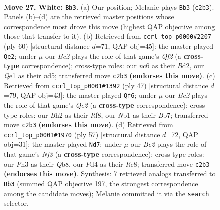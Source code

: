 \documentclass[11pt]{article}
\begin{document}
\clearpage

\begin{figure}[p]\centering
\begin{subfigure}{0.46\textwidth}\centering
\resizebox{\linewidth}{!}{%
\newchessgame
\chessboard[
  setfen={r5k1/1p3pb1/pnn2qp1/3p4/3P3p/7P/PPB2PPB/RN2Q1K1 w - - 0 27},
  showmover=false,
  pgfstyle=straightmove, color=movearrow, markmove={c2-b3}
]}
\caption{}
\end{subfigure}\hfill
\begin{subfigure}{0.46\textwidth}\centering
\resizebox{\linewidth}{!}{%
\newchessgame
\chessboard[
  setfen={3r2k1/1bq2p1p/1p2p1p1/pB1nP1P1/8/P4P2/1P1B1QP1/3R2K1 w - - 9 31},
  showmover=false,
  pgfstyle=straightmove, color=movearrow, markmove={f2-e2}
]}
\caption{}
\end{subfigure}
\\[4pt]
\begin{subfigure}{0.46\textwidth}\centering
\resizebox{\linewidth}{!}{%
\newchessgame
\chessboard[
  setfen={5rk1/1b2qpp1/1p1b3p/p2p4/3N4/1PQ1P2B/P4PPP/2R3K1 b - - 1 24},
  showmover=false,
  pgfstyle=straightmove, color=movearrow, markmove={e7-f6}
]}
\caption{}
\end{subfigure}\hfill
\begin{subfigure}{0.46\textwidth}\centering
\resizebox{\linewidth}{!}{%
\newchessgame
\chessboard[
  setfen={1qr3k1/5pp1/p3pn1p/1b6/pP2P3/P3QN1P/5PP1/1BR3K1 b - - 5 29},
  showmover=false,
  pgfstyle=straightmove, color=movearrow, markmove={f6-d7}
]}
\caption{}
\end{subfigure}
\caption{\textbf{Move 27, White: \texttt{Bb3}.} (a) Our position; Melanie plays \texttt{Bb3} (\texttt{c2b3}). Panels (b)--(d) are the retrieved master positions whose correspondence most drove this move (highest QAP objective among those that transfer to it). (b) Retrieved from \texttt{ccrl\_top\_p0000\#2207} (ply 60) [structural distance $d$=71, QAP obj=45]: the master played \texttt{Qe2}; under $\mu$ our \emph{Bc2} plays the role of that game's \emph{Qf2} (a \textbf{cross-type} correspondence); cross-type roles: our \emph{n}c6 as their \emph{B}d2, our \emph{Q}e1 as their \emph{n}d5; transferred move \texttt{c2b3} \textbf{(endorses this move)}. (c) Retrieved from \texttt{ccrl\_top\_p0001\#1392} (ply 47) [structural distance $d$=79, QAP obj=43]: the master played \texttt{Qf6}; under $\mu$ our \emph{Bc2} plays the role of that game's \emph{Qe2} (a \textbf{cross-type} correspondence); cross-type roles: our \emph{B}h2 as their \emph{R}f8, our \emph{N}b1 as their \emph{B}b7; transferred move \texttt{c2b3} \textbf{(endorses this move)}. (d) Retrieved from \texttt{ccrl\_top\_p0001\#1970} (ply 57) [structural distance $d$=72, QAP obj=31]: the master played \texttt{Nd7}; under $\mu$ our \emph{Bc2} plays the role of that game's \emph{Nf3} (a \textbf{cross-type} correspondence); cross-type roles: our \emph{P}h3 as their \emph{Q}b8, our \emph{P}d4 as their \emph{R}c8; transferred move \texttt{c2b3} \textbf{(endorses this move)}. Synthesis: 7 retrieved analogs transferred to \texttt{Bb3} (summed QAP objective 197, the strongest correspondence among the candidate moves); Melanie committed it via the \texttt{search} selector.}
\label{fig:thought-m52}
\end{figure}
\end{document}
